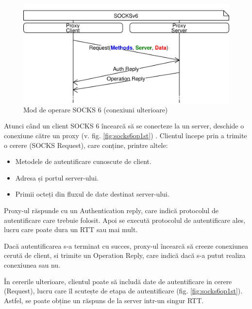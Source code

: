\begin{figure}[h]
	\centering
	\includegraphics[scale=0.7]{figures/socks/socks6op2nd.png}
	\caption{Mod de operare SOCKS 6 (conexiuni ulterioare)}
    	\label{fig:socks6op2nd}
\end{figure}

Atunci când un client SOCKS 6 încearcă să se conecteze la un server, deschide o conexiune către un proxy (v. fig. \ref{fig:socks6op1st}) .
Clientul începe prin a trimite o cerere (SOCKS Request), care conține, printre altele:
\begin{itemize}
	\item Metodele de autentificare cunoscute de client.
	\item Adresa și portul server-ului.
	\item Primii octeți din fluxul de date destinat server-ului.
\end{itemize}

Proxy-ul răspunde cu un Authentication reply, care indică protocolul de autentificare care trebuie folosit.
Apoi se execută protocolul de autentificare ales, lucru care poate dura un RTT sau mai mult.

Dacă autentificarea s-a terminat cu succes, proxy-ul încearcă să creeze conexiunea cerută de client, si trimite un Operation Reply, care indică dacă s-a putut realiza conexiunea sau nu.

În cererile ulterioare, clientul poate să includă date de autentificare in cerere (Request), lucru care îl scutește de etapa de autentificare (fig. \ref{fig:socks6op1st}).
Astfel, se poate obține un răspuns de la server intr-un singur RTT.

